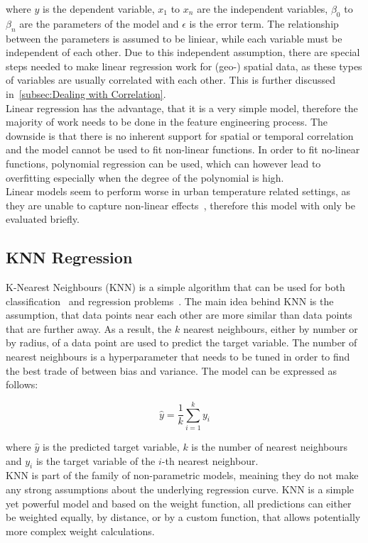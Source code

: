 where $y$ is the dependent variable, $x_1$ to $x_n$ are the independent variables, $\beta_0$ to $\beta_n$ are the parameters of the model and $\epsilon$ is the error term. The relationship between the parameters is assumed to be liniear, while each variable must be independent of each other. Due to this independent assumption, there are special steps needed to make linear regression work for (geo-) spatial data, as these types of variables are usually correlated with each other. This is further discussed in~\ref{subsec:Dealing with Correlation}.\\
Linear regression has the advantage, that it is a very simple model, therefore the majority of work needs to be done in the feature engineering process. The downside is that there is no inherent support for spatial or temporal correlation and the model cannot be used to fit non-linear functions. In order to fit no-linear functions, polynomial regression can be used, which can however lead to overfitting especially when the degree of the polynomial is high.\\
Linear models seem to perform worse in urban temperature related settings, as they are unable to capture non-linear effects~\cite{voelkel2017towards}, therefore this model with only be evaluated briefly.

\subsection{KNN Regression}

K-Nearest Neighbours (KNN) is a simple algorithm that can be used for both classification~\cite{cover1967nearest} and regression problems~\cite{altman1992introduction}. The main idea behind KNN is the assumption, that data points near each other are more similar than data points that are further away. As a result, the $k$ nearest neighbours, either by number or by radius, of a data point are used to predict the target variable. The number of nearest neighbours is a hyperparameter that needs to be tuned in order to find the best trade of between bias and variance. The model can be expressed as follows:

\begin{equation}
    \hat{y} = \frac{1}{k} \sum_{i=1}^{k} y_i
\end{equation}

where $\hat{y}$ is the predicted target variable, $k$ is the number of nearest neighbours and $y_i$ is the target variable of the $i$-th nearest neighbour.\\
KNN is part of the family of non-parametric models, meaining they do not make any strong assumptions about the underlying regression curve. KNN is a simple yet powerful model and based on the weight function, all predictions can either be weighted equally, by distance, or by a custom function, that allows potentially more complex weight calculations.

